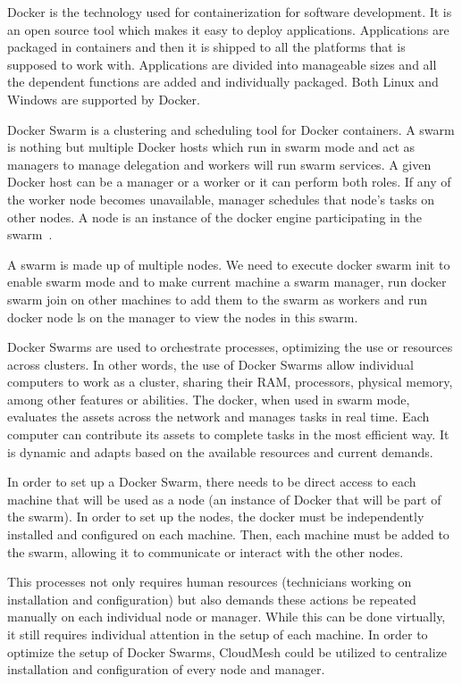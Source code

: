 Docker is the technology used for containerization for software
development. It is an open source tool which makes it easy to deploy
applications. Applications are packaged in containers and then it is
shipped to all the platforms that is supposed to work
with. Applications are divided into manageable sizes and all the
dependent functions are added and individually packaged. Both Linux
and Windows are supported by Docker.
	
Docker Swarm is a clustering and scheduling tool for Docker
containers. A swarm is nothing but multiple Docker hosts which run in
swarm mode and act as managers to manage delegation and workers will
run swarm services. A given Docker host can be a manager or a worker
or it can perform both roles. If any of the worker node becomes
unavailable, manager schedules that node's tasks on other nodes.  A
node is an instance of the docker engine participating in the
swarm~\cite{dockerdoc2017}.
	
A swarm is made up of multiple nodes. We need to execute docker swarm
init to enable swarm mode and to make current machine a swarm manager,
run docker swarm join on other machines to add them to the swarm as
workers and run docker node ls on the manager to view the nodes in
this swarm.
	
Docker Swarms are used to orchestrate processes, optimizing the use or
resources across clusters.  In other words, the use of Docker Swarms
allow individual computers to work as a cluster, sharing their RAM,
processors, physical memory, among other features or abilities.  The
docker, when used in swarm mode, evaluates the assets across the
network and manages tasks in real time. Each computer can contribute
its assets to complete tasks in the most efficient way. It is dynamic
and adapts based on the available resources and current demands.
	
In order to set up a Docker Swarm, there needs to be direct access to
each machine that will be used as a node (an instance of Docker that
will be part of the swarm).  In order to set up the nodes, the docker
must be independently installed and configured on each machine.  Then,
each machine must be added to the swarm, allowing it to communicate or
interact with the other nodes.
	
This processes not only requires human resources (technicians working
on installation and configuration) but also demands these actions be
repeated manually on each individual node or manager. While this can
be done virtually, it still requires individual attention in the setup
of each machine.  In order to optimize the setup of Docker Swarms,
CloudMesh could be utilized to centralize installation and
configuration of every node and manager.
	
